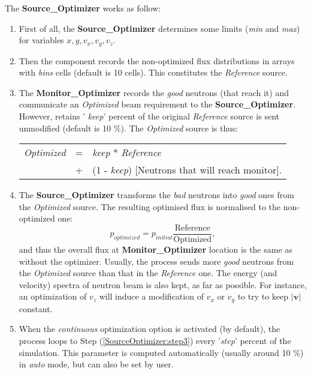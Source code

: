The \textbf{Source\_Optimizer} works as follow:
\begin{enumerate}
\item{First of all, the \textbf{Source\_Optimizer} determines some limits
    (\textit{min} and \textit{max}) for variables $x, y, v_x, v_y, v_z$.}
\item{Then the component records the non-optimized flux distributions in
    arrays with \textit{bins} cells (default is 10 cells). This constitutes
    the \textit{Reference } source.}
\item{\label {SourceOptimizer:step3}The \textbf{Monitor\_Optimizer} records
    the \textit{good} neutrons (that reach it) and communicate an \textit{
      Optimized} beam requirement to the \textbf{Source\_Optimizer}. However, retains '\textit{
      keep}' percent of the original \textit{Reference} source is sent
    unmodified (default is 10 \%). The \textit{Optimized} source is thus:

    \begin{center}
      \begin{tabular}{rcl}
        \textit{Optimized} & = & \textit{keep} * \textit{Reference} \\
        & + & (1 - \textit{keep}) [Neutrons that will reach monitor].
      \end{tabular}
    \end{center}
    }
\item{The \textbf{Source\_Optimizer} transforms the \textit{bad} neutrons into
    \textit{good} ones from the \textit{Optimized} source. The resulting
    optimised flux is normalised to the non-optimized one:
    \begin{equation}
      p_{optimized} = p_{initial} \frac{\mbox{Reference}}{\mbox{Optimized}},
    \end{equation}
    and thus the overall flux at \textbf{Monitor\_Optimizer} location is
    the same as without the optimizer. Usually, the process sends more
    \textit{good} neutrons from the \textit{Optimized} source than that in the
    \textit{Reference} one.
    The energy (and velocity) spectra of neutron beam is also kept, as
    far as possible. For instance, an optimization of $v_z$ will induce
    a modification of $v_x$ or $v_y$ to try to keep $|\textbf{v}|$
    constant.
    }
\item{When the \textit{continuous} optimization option is activated (by
    default), the process loops to Step (\ref{SourceOptimizer:step3})
    every '\textit{step}' percent of the simulation. This parameter is
    computed automatically (usually around 10 \%) in \textit{auto} mode,
    but can also be set by user.}
\end{enumerate}

